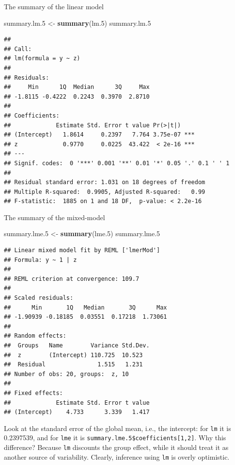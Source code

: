 \documentclass[]{book}
\newenvironment{Shaded}{\begin{snugshade}}{\end{snugshade}}
\newcommand{\KeywordTok}[1]{\textcolor[rgb]{0.13,0.29,0.53}{\textbf{{#1}}}}
\newcommand{\FloatTok}[1]{\textcolor[rgb]{0.00,0.00,0.81}{{#1}}}
\newcommand{\StringTok}[1]{\textcolor[rgb]{0.31,0.60,0.02}{{#1}}}
\newcommand{\NormalTok}[1]{{#1}}
\theoremstyle{definition}
\theoremstyle{definition}
\theoremstyle{remark}
\begin{document}
The summary of the linear model

\begin{Shaded}
\begin{Highlighting}[]
\NormalTok{summary.lm}\FloatTok{.5} \NormalTok{<-}\StringTok{ }\KeywordTok{summary}\NormalTok{(lm}\FloatTok{.5}\NormalTok{)}
\NormalTok{summary.lm}\FloatTok{.5}
\end{Highlighting}
\end{Shaded}

\begin{verbatim}
## 
## Call:
## lm(formula = y ~ z)
## 
## Residuals:
##     Min      1Q  Median      3Q     Max 
## -1.8115 -0.4222  0.2243  0.3970  2.8710 
## 
## Coefficients:
##             Estimate Std. Error t value Pr(>|t|)    
## (Intercept)   1.8614     0.2397   7.764 3.75e-07 ***
## z             0.9770     0.0225  43.422  < 2e-16 ***
## ---
## Signif. codes:  0 '***' 0.001 '**' 0.01 '*' 0.05 '.' 0.1 ' ' 1
## 
## Residual standard error: 1.031 on 18 degrees of freedom
## Multiple R-squared:  0.9905, Adjusted R-squared:   0.99 
## F-statistic:  1885 on 1 and 18 DF,  p-value: < 2.2e-16
\end{verbatim}

The summary of the mixed-model

\begin{Shaded}
\begin{Highlighting}[]
\NormalTok{summary.lme}\FloatTok{.5} \NormalTok{<-}\StringTok{ }\KeywordTok{summary}\NormalTok{(lme}\FloatTok{.5}\NormalTok{)}
\NormalTok{summary.lme}\FloatTok{.5}
\end{Highlighting}
\end{Shaded}

\begin{verbatim}
## Linear mixed model fit by REML ['lmerMod']
## Formula: y ~ 1 | z
## 
## REML criterion at convergence: 109.7
## 
## Scaled residuals: 
##      Min       1Q   Median       3Q      Max 
## -1.90939 -0.18185  0.03551  0.17218  1.73061 
## 
## Random effects:
##  Groups   Name        Variance Std.Dev.
##  z        (Intercept) 110.725  10.523  
##  Residual               1.515   1.231  
## Number of obs: 20, groups:  z, 10
## 
## Fixed effects:
##             Estimate Std. Error t value
## (Intercept)    4.733      3.339   1.417
\end{verbatim}

Look at the standard error of the global mean, i.e., the intercept: for
\texttt{lm} it is 0.2397539, and for \texttt{lme} it is
\texttt{summary.lme.5\$coefficients{[}1,2{]}}. Why this difference?
Because \texttt{lm} discounts the group effect, while it should treat it
as another source of variability. Clearly, inference using \texttt{lm}
is overly optimistic.
\end{document}

